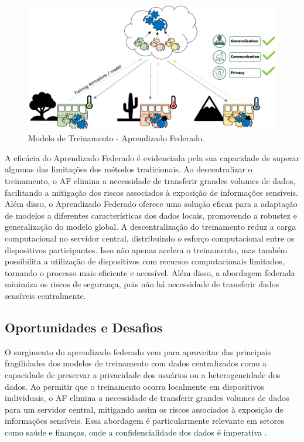 \begin{figure}[ht]
    \centering
    \includegraphics[scale=0.50]{figuras/teorica/FederatedLearning.eps}
    \caption{Modelo de Treinamento - Aprendizado Federado.}
    \label{fig:FederatedLearning}
\end{figure}

A eficácia do Aprendizado Federado é evidenciada pela sua capacidade de superar algumas das limitações dos métodos tradicionais. Ao descentralizar o treinamento, o AF elimina a necessidade de transferir grandes volumes de dados, facilitando a mitigação dos riscos associados à exposição de informações sensíveis. Além disso, o Aprendizado Federado oferece uma solução eficaz para a adaptação de modelos a diferentes características dos dados locais, promovendo a robustez e generalização do modelo global. A descentralização do treinamento reduz a carga computacional no servidor central, distribuindo o esforço computacional entre os dispositivos participantes\cite{yang2019federated}. Isso não apenas acelera o treinamento, mas também possibilita a utilização de dispositivos com recursos computacionais limitados, tornando o processo mais eficiente e acessível. Além disso, a abordagem federada minimiza os riscos de segurança, pois não há necessidade de transferir dados sensíveis centralmente\cite{bonawitz2019towards}.

\subsection{Oportunidades e Desafios}

O surgimento do aprendizado federado vem para aproveitar das principais fragilidades dos modelos de treinamento com dados centralizados como a capacidade de preservar a privacidade dos usuários ou a heterogeneidade dos dados. Ao permitir que o treinamento ocorra localmente em dispositivos individuais, o AF elimina a necessidade de transferir grandes volumes de dados para um servidor central, mitigando assim os riscos associados à exposição de informações sensíveis. Essa abordagem é particularmente relevante em setores como saúde e finanças, onde a confidencialidade dos dados é imperativa \cite{mcmahan2017communication}.


